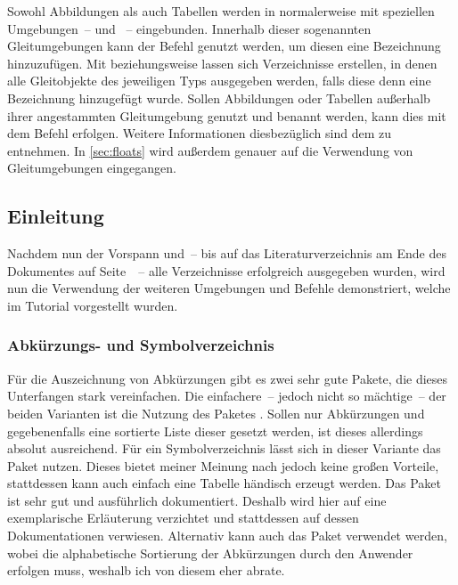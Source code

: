 \documentclass[%
  english,ngerman,%
  cdgeometry=no,DIV=12,automark,%
]{tudscrartcl}
\begin{document}
Sowohl Abbildungen als auch Tabellen werden in  normalerweise 
mit speziellen Umgebungen~--  und ~-- 
eingebunden. Innerhalb dieser sogenannten Gleitumgebungen kann der Befehl 
 genutzt 
werden, um diesen eine Bezeichnung hinzuzufügen. Mit  
beziehungsweise  lassen sich Verzeichnisse erstellen, in 
denen alle Gleitobjekte des jeweiligen Typs ausgegeben werden, falls diese denn 
eine Bezeichnung hinzugefügt wurde. Sollen Abbildungen oder Tabellen außerhalb 
ihrer angestammten Gleitumgebung genutzt und benannt werden, kann dies mit dem 
Befehl 
 erfolgen. Weitere Informationen diesbezüglich sind dem 
\scrguide zu entnehmen. In \autoref{sec:floats} wird außerdem genauer auf die 
Verwendung von Gleitumgebungen eingegangen.
%
\begin{Trunk}
\tableofcontents
\listoffigures
\listoftables

\end{Trunk}
\begin{Trunk+}
\printacronyms[style=acrotabu]
\printsymbols[style=symblongtabu]

\chapter{Einleitung}
Nachdem nun der Vorspann und~-- bis auf das Literaturverzeichnis am 
Ende des Dokumentes auf Seite~\pageref{sec:bibliography}~-- alle 
Verzeichnisse erfolgreich ausgegeben wurden, wird nun die Verwendung 
der weiteren Umgebungen und Befehle demonstriert, welche im Tutorial 
 vorgestellt wurden.

\end{Trunk+}


\subsection{Abkürzungs- und Symbolverzeichnis}
\label{sec:glossaries}
Für die Auszeichnung von Abkürzungen gibt es zwei sehr gute Pakete, die dieses 
Unterfangen stark vereinfachen. Die einfachere~-- jedoch nicht so mächtige~-- 
der beiden Varianten ist die Nutzung des Paketes . Sollen nur 
Abkürzungen und gegebenenfalls eine sortierte Liste dieser gesetzt werden, ist 
dieses allerdings absolut ausreichend. Für ein Symbolverzeichnis lässt sich in 
dieser Variante das Paket  nutzen. Dieses bietet meiner 
Meinung nach jedoch keine großen Vorteile, stattdessen kann auch einfach eine 
Tabelle händisch erzeugt werden. Das Paket  ist sehr gut und 
ausführlich dokumentiert. Deshalb wird hier auf eine exemplarische Erläuterung 
verzichtet und stattdessen auf dessen Dokumentationen verwiesen. Alternativ 
kann auch das Paket  verwendet werden, wobei die alphabetische 
Sortierung der Abkürzungen durch den Anwender erfolgen muss, weshalb ich von 
diesem eher abrate.
\end{document}

